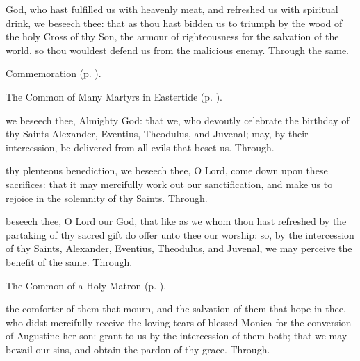 
\postcommunion
{} God, who hast fulfilled us with heavenly meat, and refreshed us with spiritual drink, we beseech thee: that as thou hast bidden us to triumph by the wood of the holy Cross of thy Son, the armour of righteousness for the salvation of the world, so thou wouldest defend us from the malicious enemy. Through the same.
\begin{rubric}
	 Commemoration  (p. \pageref{AlexanderEtcPostcommunion}).
\end{rubric}



\begin{rubric}
	The Common of Many Martyrs in Eastertide (p. \pageref{CommonMartyrsEaster}).
\end{rubric}

\collect\label{AlexanderEtcCollect}
 we beseech thee, Almighty God: that we, who devoutly celebrate the birthday of thy Saints Alexander, Eventius, Theodulus, and Juvenal; may, by their intercession, be delivered from all evils that beset us. Through.

\secret\label{AlexanderEtcSecret}
 thy plenteous benediction, we beseech thee, O Lord, come down upon these sacrifices: that it may mercifully work out our sanctification, and make us to rejoice in the solemnity of thy Saints. Through.

\postcommunion\label{AlexanderEtcPostcommunion}
 beseech thee, O Lord our God, that like as we whom thou hast refreshed by the partaking of thy sacred gift do offer unto thee our worship: so, by the intercession of thy Saints, Alexander, Eventius, Theodulus, and Juvenal, we may perceive the benefit of the same. Through.


\clearpage
{}

\begin{rubric}
	The Common of a Holy Matron (p. \pageref{CommonNeitherVirginMartyr}).
\end{rubric}

\collect
{} the comforter of them that mourn, and the salvation of them that hope in thee, who didst mercifully receive the loving tears of blessed Monica for the conversion of Augustine her son: grant to us by the intercession of them both; that we may bewail our sins, and obtain the pardon of thy grace. Through.

